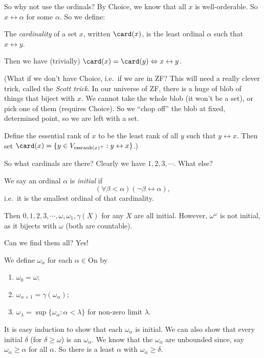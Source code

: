 \documentclass[a4paper]{article}
\begin{document}
So why not use the ordinals? By Choice, we know that all $x$ is well-orderable. So $x\leftrightarrow \alpha$ for some $\alpha$. So we define:
\begin{defi}[Cardinality]
  The \emph{cardinality} of a set $x$, written $\card(x)$, is the least ordinal $\alpha$ such that $x\leftrightarrow y$.
\end{defi}
Then we have (trivially) $\card(x) = \card(y) \Leftrightarrow x\leftrightarrow y$.

(What if we don't have Choice, i.e.\ if we are in ZF? This will need a really clever trick, called the \emph{Scott trick}. In our universe of ZF, there is a huge of blob of things that biject with $x$. We cannot take the whole blob (it won't be a set), or pick one of them (requires Choice). So we ``chop off'' the blob at fixed, determined point, so we are left with a set.

Define the essential rank of $x$ to be the least rank of all $y$ such that $y\leftrightarrow x$. Then set $\card (x) = \{y\in V_{\mathrm{essrank}(x)^+}: y\leftrightarrow x\}$.)

So what cardinals are there? Clearly we have $1, 2, 3, \cdots$. What else?

\begin{defi}
  We say an ordinal $\alpha$ is \emph{initial} if
  \[
    (\forall \beta < \alpha)(\neg \beta \leftrightarrow \alpha),
  \]
  i.e.\ it is the smallest ordinal of that cardinality.
\end{defi}

Then $0, 1, 2, 3, \cdots, \omega, \omega_1, \gamma(X)$ for any $X$ are all initial. However, $\omega^\omega$ is not initial, as it bijects with $\omega$ (both are countable).

Can we find them all? Yes!
\begin{defi}\index{$\omega_\alpha$}
  We define $\omega_\alpha$ for each $\alpha \in \mathrm{On}$ by
  \begin{enumerate}
    \item $\omega_0 = \omega$;
    \item $\omega_{\alpha + 1} = \gamma(\omega_\alpha)$;
    \item $\omega_\lambda = \sup\{\omega_\alpha: \alpha < \lambda\}$ for non-zero limit $\lambda$.
  \end{enumerate}
\end{defi}
It is easy induction to show that each $\omega_\alpha$ is initial. We can also show that every initial $\delta$ (for $\delta \geq \omega$) is an $\omega_\alpha$. We know that the $\omega_\alpha$ are unbounded since, say $\omega_\alpha \geq \alpha$ for all $\alpha$. So there is a least $\alpha$ with $\omega_\alpha \geq \delta$.
\end{document}
